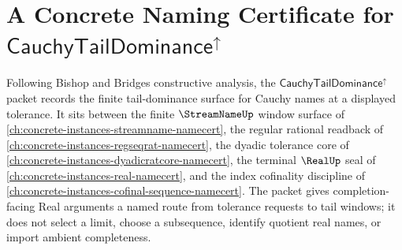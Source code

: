 \providecommand{\CauchyTailDominanceUp}{\mathsf{CauchyTailDominance}^{\uparrow}}

\chapter{A Concrete Naming Certificate for $\CauchyTailDominanceUp$}
\label{ch:concrete-instances-cauchy-tail-dominance-namecert}

Following Bishop and Bridges constructive analysis, the $\CauchyTailDominanceUp$ packet records the finite tail-dominance surface for Cauchy names at a displayed tolerance. It sits between the finite $\StreamNameUp$ window surface of \autoref{ch:concrete-instances-streamname-namecert}, the regular rational readback of \autoref{ch:concrete-instances-regseqrat-namecert}, the dyadic tolerance core of \autoref{ch:concrete-instances-dyadicratcore-namecert}, the terminal $\RealUp$ seal of \autoref{ch:concrete-instances-real-namecert}, and the index cofinality discipline of \autoref{ch:concrete-instances-cofinal-sequence-namecert}. The packet gives completion-facing Real arguments a named route from tolerance requests to tail windows; it does not select a limit, choose a subsequence, identify quotient real names, or import ambient completeness.

